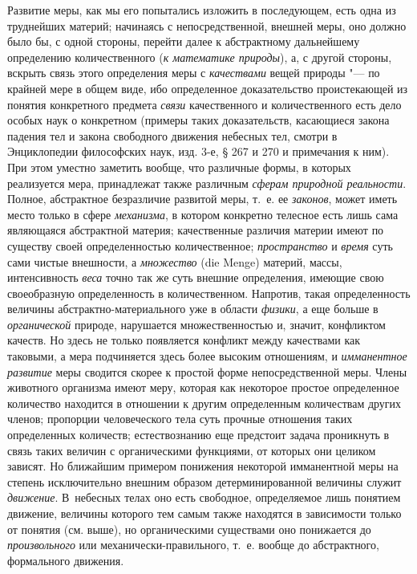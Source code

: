 Развитие меры, как мы его попытались изложить в последующем, есть одна из
труднейших материй; начинаясь с непосредственной, внешней меры, оно должно
было бы, с одной стороны, перейти далее к абстрактному дальнейшему
определению количественного ({\em к математике
природы}), а, с другой стороны, вскрыть связь этого определения меры с
{\em качествами} вещей природы "--- по крайней мере в
общем виде, ибо определенное доказательство проистекающей из понятия
конкретного предмета {\em связи} качественного и
количественного есть дело особых наук о конкретном (примеры таких
доказательств, касающиеся закона падения тел и закона свободного движения
небесных тел, смотри в Энциклопедии философских наук, изд. 3-е, § 267 и 270
и примечания к ним). При этом уместно заметить вообще, что различные формы,
в которых реализуется мера, принадлежат также различным
{\em сферам природной реальности}. Полное, абстрактное
безразличие развитой меры, т.~е. ее {\em законов},
может иметь место только в сфере {\em механизма}, в
котором конкретно телесное есть лишь сама являющаяся абстрактной материя;
качественные различия материи имеют по существу своей определенностью
количественное; {\em пространство} и
{\em время} суть сами чистые внешности, а
{\em множество} (die Menge) материй, массы,
интенсивность {\em веса} точно так же суть внешние
определения, имеющие свою своеобразную определенность в количественном.
Напротив, такая определенность величины абстрактно-материального уже в
области {\em физики}, а еще больше в
{\em органической} природе, нарушается множественностью
и, значит, конфликтом качеств. Но здесь не только появляется конфликт между
качествами как таковыми, а мера подчиняется здесь более высоким отношениям,
и {\em имманентное развитие} меры сводится скорее к
простой форме непосредственной меры. Члены животного организма имеют меру,
которая как некоторое простое определенное количество находится в отношении
к другим определенным количествам других членов; пропорции человеческого
тела суть прочные отношения таких определенных количеств; естествознанию
еще предстоит задача проникнуть в связь таких величин с органическими
функциями, от которых они целиком зависят. Но ближайшим примером понижения
некоторой имманентной меры на степень исключительно внешним образом
детерминированной величины служит {\em движение}.
В~небесных телах оно есть свободное, определяемое лишь понятием движение,
величины которого тем самым также находятся в зависимости только от понятия
(см. выше), но органическими существами оно понижается до
{\em произвольного} или механически-правильного, т.~е.
вообще до абстрактного, формального движения.

